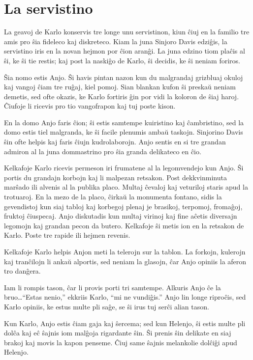 \chapter{La servistino}

La geavoj de Karlo konservis tre longe unu servistinon, kiun ĉiuj en la familio tre amis pro ŝia fideleco kaj diskreteco. Kiam la juna Sinjoro Davis edziĝis, la servistino iris en la novan hejmon por ĉion aranĝi. La juna edzino tiom plaĉis al ŝi, ke ŝi tie restis; kaj post la naskiĝo de Karlo, ŝi decidis, ke ŝi neniam foriros.

Ŝia nomo estis Anjo. Ŝi havis pintan nazon kun du malgrandaj grizbluaj okuloj kaj vangoj ĉiam tre ruĝaj, kiel pomoj. Sian blankan kufon ŝi preskaŭ neniam demetis, sed ofte okazis, ke Karlo fortiris ĝin por vidi la koloron de ŝiaj haroj. Ĉiufoje li ricevis pro tio vangofrapon kaj tuj poste kison.

En la domo Anjo faris ĉion; ŝi estis samtempe kuiristino kaj ĉambristino, sed la domo estis tiel malgranda, ke ŝi facile plenumis ambaŭ taskojn. Sinjorino Davis ŝin ofte helpis kaj faris ĉiujn kudrolaborojn. Anjo sentis en si tre grandan admiron al la juna dommastrino pro ŝia granda delikateco en ĉio.

Kelkafoje Karlo ricevis permeson iri frumatene al la legomvendejo kun Anjo. Ŝi portis du grandajn korbojn kaj li malpezan retsakon. Post dekkvinminuta marŝado ili alvenis al la publika placo. Multaj ĉevaloj kaj veturiloj staris apud la trotuaroj. En la mezo de la placo, ĉirkaŭ la monumenta fontano, sidis la gevendistoj kun siaj tabloj kaj korbegoj plenaj je brasikoj, terpomoj, fromaĝoj, fruktoj ĉiuspecaj. Anjo diskutadis kun multaj virinoj kaj fine aĉetis diversajn legomojn kaj grandan pecon da butero. Kelkafoje ŝi metis ion en la retsakon de Karlo. Poste tre rapide ili hejmen revenis.

Kelkafoje Karlo helpis Anjon meti la telerojn sur la tablon. La forkojn, kulerojn kaj tranĉilojn li ankaŭ alportis, sed neniam la glasojn, ĉar Anjo opiniis la aferon tro danĝera.

Iam li rompis tason, ĉar li provis porti tri samtempe. Alkuris Anjo ĉe la bruo\ldots{}``Estas nenio,'' ekkriis Karlo, ``mi ne vundiĝis.'' Anjo lin longe riproĉis, sed Karlo opiniis, ke estus multe pli saĝe, se ŝi irus tuj serĉi alian tason.

Kun Karlo, Anjo estis ĉiam gaja kaj ŝercema; sed kun Helenjo, ŝi estis multe pli dolĉa kaj eĉ ŝajnis iom malĝoja rigardante ŝin. Ŝi prenis ŝin delikate en siaj brakoj kaj movis la kapon penseme. Ĉiuj same ŝajnis melankolie dolĉiĝi apud Helenjo.

